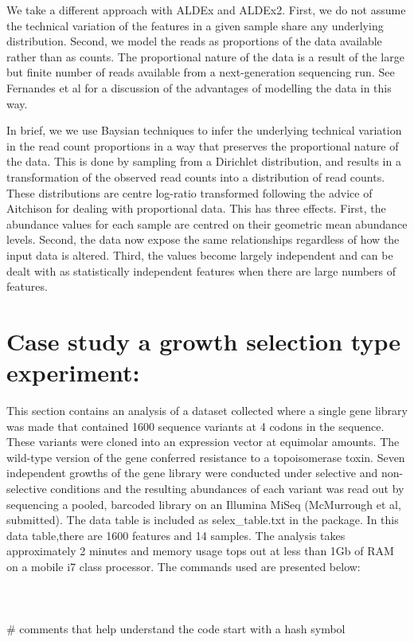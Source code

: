 \documentclass[11pt]{amsart}
\begin{document}
We take a different approach with ALDEx and ALDEx2. First, we do not assume the technical variation of the features in a given sample share any underlying distribution. Second, we model the reads as proportions  of the data available rather than as counts. The proportional nature of the data is a result of the large but finite number of reads available from a next-generation sequencing run. See Fernandes et al\cite{fernandes:2013} for a discussion of the advantages of modelling the data in this way. 

In brief, we we use Baysian techniques to infer the underlying technical variation in the read count proportions in a way that preserves the proportional nature of the data. This is done by sampling from a Dirichlet distribution, and results in a transformation of the observed read counts into a distribution of read counts. These distributions are centre log-ratio transformed following the advice of Aitchison\cite{Aitchison:1986} for dealing with proportional data. This has three effects. First, the abundance values for each sample are centred on their geometric mean abundance levels. Second, the data now expose the same relationships regardless of how the input data is altered. Third, the values become largely independent and can be dealt with as statistically independent features when there are large numbers of features.  

\section{Case study a growth selection type experiment:} This section contains an analysis of a dataset collected where a single gene  library was made that contained 1600 sequence variants at 4 codons in the sequence. These variants were cloned into an expression vector at equimolar amounts. The wild-type version of the gene conferred resistance to a topoisomerase toxin. Seven independent growths of the gene library were conducted under selective and non-selective conditions and the resulting abundances of each variant was read out by sequencing a pooled, barcoded library on an Illumina MiSeq (McMurrough et al, submitted). The data table is included as selex\_table.txt in the package. In this data table,there are 1600 features and 14 samples. The analysis takes approximately 2 minutes and memory usage tops out at less than 1Gb of RAM on a mobile i7 class processor.  The commands used are presented below:\\\\
\\\\
\noindent \#  comments that help understand the code start with a hash symbol\\
\end{document}
